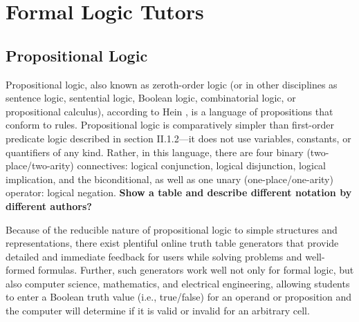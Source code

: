 \documentclass[ms]{uncgdissertationexp2}
\theoremstyle{plain}
\theoremstyle{definition}
\theoremstyle{remark}
\begin{document}
    \section{Formal Logic Tutors}
        \subsection{Propositional Logic}
        Propositional logic, also known as zeroth-order logic (or in other disciplines as sentence logic, sentential logic, Boolean logic, combinatorial logic, or propositional calculus), according to Hein \cite{hein}, is a language of propositions that conform to rules. Propositional logic is comparatively simpler than first-order predicate logic described in section II.1.2---it does not use variables, constants, or quantifiers of any kind. Rather, in this language, there are four binary (two-place/two-arity) connectives: logical conjunction, logical disjunction, logical implication, and the biconditional, as well as one unary (one-place/one-arity) operator: logical negation. \textbf{Show a table and describe different notation by different authors?}
        
        Because of the reducible nature of propositional logic to simple structures and representations, there exist plentiful online truth table generators that provide detailed and immediate feedback for users while solving problems and well-formed formulas. Further, such generators work well not only for formal logic, but also computer science, mathematics, and electrical engineering, allowing students to enter a Boolean truth value (i.e., true/false) for an operand or proposition and the computer will determine if it is valid or invalid for an arbitrary cell. 
\end{document}
